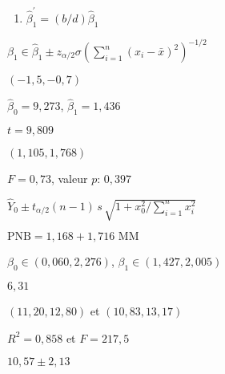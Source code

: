 \begin{reponse}{2.9}
    \begin{enumerate}
    \item $\hat{\beta}_1^\prime = (b/d) \hat{\beta}_1$
    \end{enumerate}
  
\end{reponse}
\begin{reponse}{2.11}
    $\beta_1 \in \hat{\beta}_1 \pm z_{\alpha/2} \sigma
    \left( \sum_{i=1}^n (x_i - \bar{x})^2 \right)^{-1/2}$
  
\end{reponse}
\begin{reponse}{2.12}
    $(-1,5, -0,7)$
  
\end{reponse}
\begin{reponse}{2.13}
    \begin{inparaenum}
    \item $\hat{\beta}_0 = 9,273$, $\hat{\beta}_1 = 1,436$
    \item $t = 9,809$
    \item $(1,105, 1,768)$
    \end{inparaenum}
  
\end{reponse}
\begin{reponse}{2.14}
    $F = 0,73$, valeur $p$: $0,397$
  
\end{reponse}
\begin{reponse}{2.15}
    $\hat{Y}_0 \pm t_{\alpha/2}(n - 1)\, s\,
    \sqrt{1 + x_0^2/\sum_{i=1}^n x_i^2}$
  
\end{reponse}
\begin{reponse}{2.16}
    \begin{inparaenum}
    \item $\text{PNB} = 1,168 + 1,716 \text{ MM}$
    \item $\beta_0 \in (0,060, 2,276)$, $\beta_1 \in (1,427, 2,005)$
    \item $6,31$
    \item $(11,20, 12,80)$ et $(10,83, 13,17)$
    \end{inparaenum}
  
\end{reponse}
\begin{reponse}{2.18}
    \begin{inparaenum}
    \item $R^2 = 0,858$ et
      $F = 217,5$
    \item $10,57 \pm
      2,13$
    \end{inparaenum}
  
\end{reponse}
